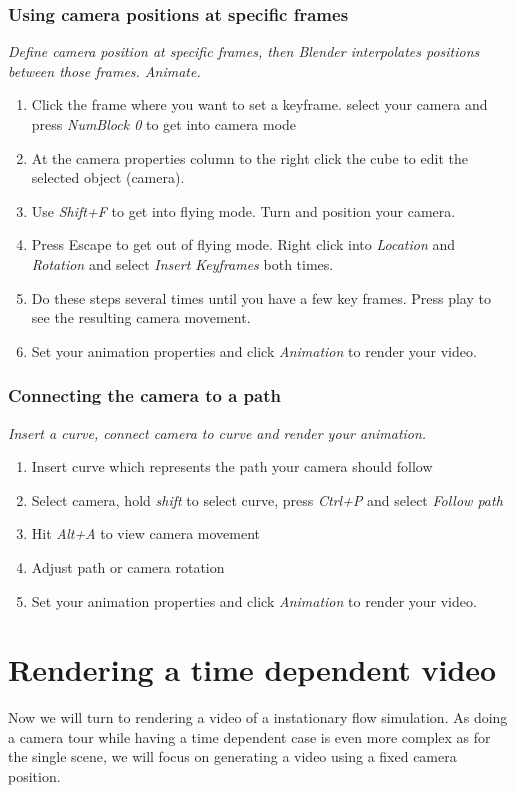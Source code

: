 \documentclass[11pt,twoside,a4paper]{fdyartcl}
\theoremstyle{myPlain}
\theoremstyle{myDefinition}
\begin{document}
\subsubsection{Using camera positions at specific frames}
\textit{Define camera position at specific frames, then Blender interpolates positions between those frames. Animate.}
\begin{enumerate}
	\item Click the frame where you want to set a keyframe. select your camera and press \textit{NumBlock 0} to get into camera mode
	\item At the camera properties column to the right click the cube to edit the selected object (camera).
	\item Use \textit{Shift+F} to get into flying mode. Turn and position your camera.
	\item Press Escape to get out of flying mode. Right click into \textit{Location} and \textit{Rotation } and select \textit{Insert Keyframes} both times.
	\item Do these steps several times until you have a few key frames. Press play to see the resulting camera movement.
	\item Set your animation properties and click \textit{Animation} to render your video.
\end{enumerate}
\subsubsection{Connecting the camera to a path}
\textit{Insert a curve, connect camera to curve and render your animation.}
\begin{enumerate}
	\item Insert curve which represents the path your camera should follow
	\item Select camera, hold \textit{shift} to select curve, press \textit{Ctrl+P} and select \textit{Follow path}
	\item Hit \textit{Alt+A} to view camera movement
	\item Adjust path or camera rotation
	\item Set your animation properties and click \textit{Animation} to render your video.
\end{enumerate}


\section{Rendering a time dependent video}
Now we will turn to rendering a video of a instationary flow simulation. As doing a camera tour while having a time dependent case is even more complex as for the single scene, we will focus on generating a video using a fixed camera position.
\end{document}

